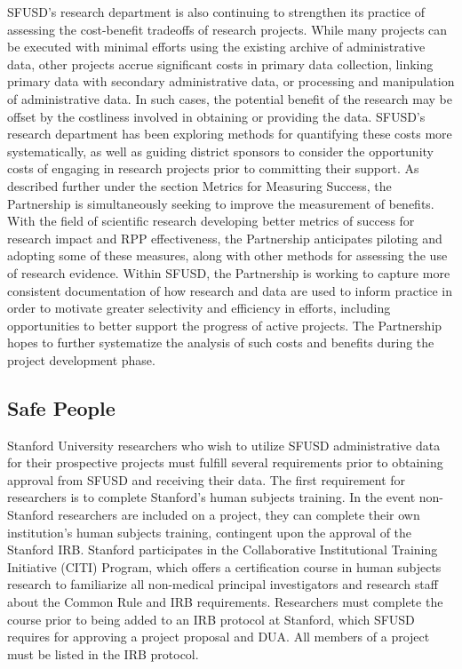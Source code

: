 SFUSD's research department is also continuing to strengthen its practice of assessing the cost-benefit tradeoffs of research projects. While many projects can be executed with minimal efforts using the existing archive of administrative data, other projects accrue significant costs in primary data collection, linking primary data with secondary administrative data, or processing and manipulation of administrative data. In such cases, the potential benefit of the research may be offset by the costliness involved in obtaining or providing the data. SFUSD's research department has been exploring methods for quantifying these costs more systematically, as well as guiding district sponsors to consider the opportunity costs of engaging in research projects prior to committing their support. As described further under the section Metrics for Measuring Success, the Partnership is simultaneously seeking to improve the measurement of benefits. With the field of scientific research developing better metrics of success for research impact and RPP effectiveness, the Partnership anticipates piloting and adopting some of these measures, along with other methods for assessing the use of research evidence. Within SFUSD, the Partnership is working to capture more consistent documentation of how research and data are used to inform practice in order to motivate greater selectivity and efficiency in efforts, including opportunities to better support the progress of active projects. The Partnership hopes to further systematize the analysis of such costs and benefits during the project development phase.

\hypertarget{safe-people-4}{%
\subsection{Safe People}\label{safe-people-4}}

Stanford University researchers who wish to utilize SFUSD administrative data for their prospective projects must fulfill several requirements prior to obtaining approval from SFUSD and receiving their data. The first requirement for researchers is to complete Stanford's human subjects training. In the event non-Stanford researchers are included on a project, they can complete their own institution's human subjects training, contingent upon the approval of the Stanford IRB. Stanford participates in the Collaborative Institutional Training Initiative (CITI) Program, which offers a certification course in human subjects research to familiarize all non-medical principal investigators and research staff about the Common Rule and IRB requirements. Researchers must complete the course prior to being added to an IRB protocol at Stanford, which SFUSD requires for approving a project proposal and DUA. All members of a project must be listed in the IRB protocol.

